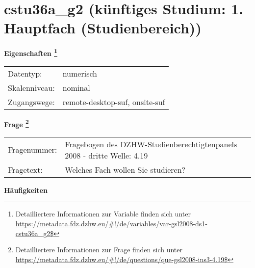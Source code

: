 
    \setcounter{footnote}{0}

    \vspace*{-1.8cm}
	\section{cstu36a\_g2 (künftiges Studium: 1. Hauptfach (Studienbereich))}
	\label{section:cstu36a_g2}



    \vspace*{0.5cm}
    \noindent\textbf{Eigenschaften
	\footnote{Detailliertere Informationen zur Variable finden sich unter
		\url{https://metadata.fdz.dzhw.eu/\#!/de/variables/var-gsl2008-ds1-cstu36a_g2$}}}\\
	\begin{tabularx}{\hsize}{@{}lX}
	Datentyp: & numerisch \\
	Skalenniveau: & nominal \\
	Zugangswege: &
	  remote-desktop-suf, 
	  onsite-suf
 \\
    \end{tabularx}



				\vspace*{0.5cm}
                \noindent\textbf{Frage
	                \footnote{Detailliertere Informationen zur Frage finden sich unter
		              \url{https://metadata.fdz.dzhw.eu/\#!/de/questions/que-gsl2008-ins3-4.19$}}}\\
				\begin{tabularx}{\hsize}{@{}lX}
					Fragenummer: &
					  Fragebogen des DZHW-Studienberechtigtenpanels 2008 - dritte Welle:
					  4.19
 \\
					Fragetext: & Welches Fach wollen Sie studieren? \\
				\end{tabularx}





        		\vspace*{0.5cm}
                \noindent\textbf{Häufigkeiten}

